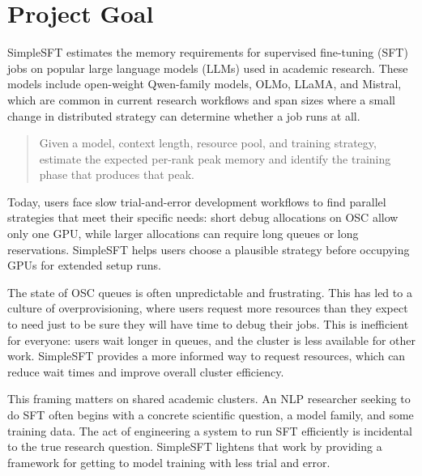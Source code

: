\section{Project Goal}
SimpleSFT estimates the memory requirements for supervised fine-tuning (SFT) jobs
on popular large language models (LLMs) used in academic research. These models
include open-weight Qwen-family models, OLMo, LLaMA, and Mistral, which are common in current research
workflows and span sizes where a small change in distributed strategy can
determine whether a job runs at all.

\begin{quote}
Given a model, context length, resource pool, and training strategy, estimate
the expected per-rank peak memory and identify the training phase that produces
that peak.
\end{quote}

Today, users face slow trial-and-error development workflows to find parallel
strategies that meet their specific needs: short debug allocations on OSC
allow only one GPU, while larger allocations can require long queues or long reservations.
SimpleSFT helps users choose a plausible strategy before occupying GPUs for extended setup runs.

The state of OSC queues is often unpredictable and frustrating. This has led to a culture of
overprovisioning, where users request more resources than they expect to need just to be
sure they will have time to debug their jobs. This is inefficient for everyone: users wait
longer in queues, and the cluster is less available for other work. SimpleSFT provides a
more informed way to request resources, which can reduce wait times and improve overall
cluster efficiency.

This framing matters on shared academic clusters. An NLP researcher seeking to do SFT often begins
with a concrete scientific question, a model family, and some training data. The act of
engineering a system to run SFT efficiently is incidental to the true research question.
SimpleSFT lightens that work by providing a framework for getting to model training with less trial and error.

